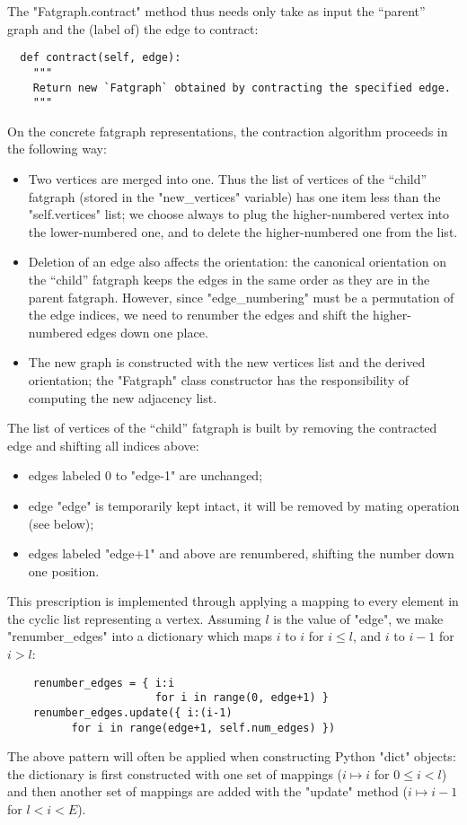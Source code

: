 The "Fatgraph.contract" method thus needs only take as input the ``parent''
graph and the (label of) the edge to contract:
\begin{lstlisting}
  def contract(self, edge):
    """
    Return new `Fatgraph` obtained by contracting the specified edge.
    """

\end{lstlisting}

On the concrete fatgraph representations, the contraction algorithm
proceeds in the following way:
\begin{itemize}
\item Two vertices are merged into one. Thus the list of vertices of
  the ``child'' fatgraph (stored in the "new_vertices" variable) has
  one item less than the "self.vertices" list; we choose always to
  plug the higher-numbered vertex into the lower-numbered one, and to
  delete the higher-numbered one from the list.
\item Deletion of an edge also affects the orientation: the canonical
  orientation on the ``child'' fatgraph keeps the edges in the same
  order as they are in the parent fatgraph.  However, since
  "edge_numbering" must be a permutation of the edge indices, we need
  to renumber the edges and shift the higher-numbered edges down one
  place.
\item The new graph is constructed with the new vertices list and the
  derived orientation; the "Fatgraph" class constructor has the
  responsibility of computing the new adjacency list. 
\end{itemize}

The list of vertices of the ``child'' fatgraph is built by removing
the contracted edge and shifting all indices above:
\begin{itemize}
\item edges labeled 0 to "edge-1" are unchanged;
\item edge "edge" is temporarily kept intact, it will be
  removed by mating operation (see below);
\item edges labeled "edge+1" and above are renumbered, 
  shifting the number down one position.
\end{itemize}
This prescription is implemented through applying a mapping to every
element in the cyclic list representing a vertex.  Assuming $l$ is the
value of "edge", we make "renumber_edges" into a dictionary which
maps $i$ to $i$ for $i \leq l$, and $i$ to $i-1$ for $i > l$:
\begin{lstlisting}
    renumber_edges = { i:i 
                       for i in range(0, edge+1) }
    renumber_edges.update({ i:(i-1)
          for i in range(edge+1, self.num_edges) })
\end{lstlisting}
The above pattern will often be applied when constructing Python
"dict" objects: the dictionary is first constructed with one set of
mappings ($i \mapsto i$ for $0 \leq i < l$) and then another set of
mappings are added with the "update" method ($i \mapsto i-1$ for $l <
i < E$).


